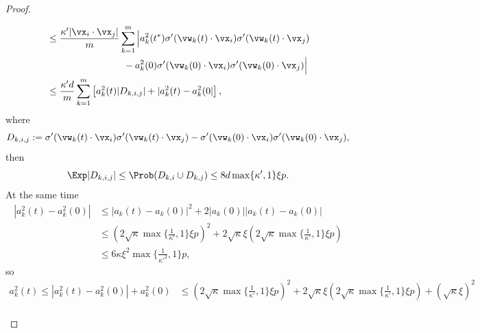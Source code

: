 \documentclass{article}
\begin{document}
\begin{proof}
\begin{enumerate}[(a)]
\begin{enumerate}[(i)]
\begin{equation}
\begin{aligned}
                                 & \leq \frac{\kappa'|\vx_i\cdot\vx_j|}{m}\sum_{k=1}^m\Big|a_k^2(t^*)\sigma'(\vw_k(t)\cdot\vx_i)\sigma'(\vw_k(t)\cdot\vx_j) \\
                                 & \quad\quad\quad\quad\quad\quad\quad\quad -a_k^2(0)\sigma'(\vw_k(0)\cdot\vx_i)\sigma'(\vw_k(0)\cdot\vx_j)\Big|            \\
                                 & \leq \frac{\kappa'd}{m}\sum_{k=1}^m\left[a_k^2(t)|D_{k,i,j}|+|a_k^2(t)-a_k^2(0|\right],
                            \end{aligned}
                        \end{equation}
                        where
                        \begin{equation}
                            D_{k,i,j}:=\sigma'(\vw_k(t)\cdot\vx_i)\sigma'(\vw_k(t)\cdot\vx_j)-\sigma'(\vw_k(0)\cdot\vx_i)\sigma'(\vw_k(0)\cdot\vx_j),
                        \end{equation}
                        then
                        \begin{equation}
                            \Exp|D_{k,i,j}|\leq\Prob(D_{k,i}\cup D_{k,j})\leq 8d\max\{\kappa',1\}\xi p.
                        \end{equation}
                        At the same time
                        \begin{equation}
                            \begin{aligned}
                                |a_k^2(t)-a_k^2(0)|
                                 & \leq|a_k(t)-a_k(0)|^2+2|a_k(0)||a_k(t)-a_k(0)|                                                                                                  \\
                                 & \leq \left(2\sqrt{\kappa}\max\{\frac{1}{\kappa'},1\}\xi p\right)^2+2\sqrt{\kappa}\xi\left(2\sqrt{\kappa}\max\{\frac{1}{\kappa'},1\}\xi p\right) \\
                                 & \leq 6\kappa\xi^2\max\{\frac{1}{\kappa'^2},1\}p,
                            \end{aligned}
                        \end{equation}
                        so
                        \begin{equation}
                            \begin{aligned}
                                a_k^2(t)\leq |a_k^2(t)-a_k^2(0)|+a_k^2(0)
                                 & \leq \left(2\sqrt{\kappa}\max\{\frac{1}{\kappa'},1\}\xi p\right)^2+2\sqrt{\kappa}\xi\left(2\sqrt{\kappa}\max\{\frac{1}{\kappa'},1\}\xi p\right) + (\sqrt{\kappa}\xi)^2 \\

\end{aligned}
\end{equation}
\end{enumerate}
\end{enumerate}
\end{proof}
\end{document}
